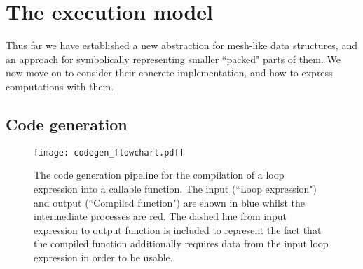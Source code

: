 \documentclass[thesis]{subfiles}
\begin{document}
\chapter{The execution model}
\label{chapter:execution_model}


Thus far we have established a new abstraction for mesh-like data structures, and an approach for symbolically representing smaller ``packed" parts of them.
We now move on to consider their concrete implementation, and how to express computations with them.

\section{Code generation}

\begin{figure}
  \centering
  \texttt{[image: codegen\_flowchart.pdf]}
  \caption{
    The code generation pipeline for the compilation of a loop expression into a callable function.
    The input (``Loop expression") and output (``Compiled function") are shown in blue whilst the intermediate processes are red.
    The dashed line from input expression to output function is included to represent the fact that the compiled function additionally requires data from the input loop expression in order to be usable.
  }
  \label{fig:codegen_flowchart}
\end{figure}


\end{document}
